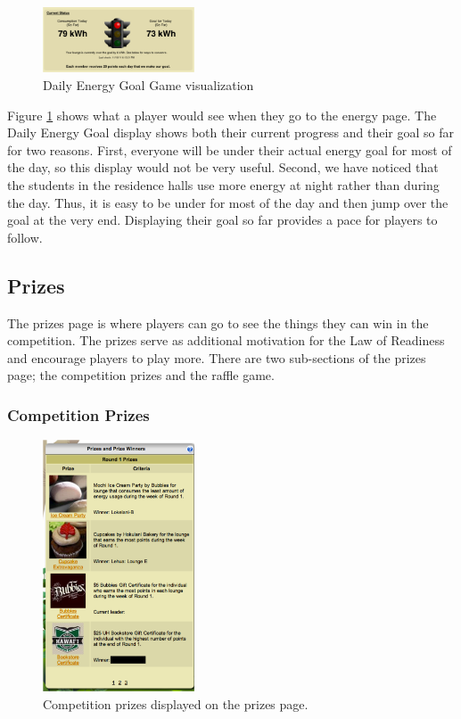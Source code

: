 \begin{figure}[t!]
  \center
  \includegraphics[width=0.4\textwidth]{images/daily-energy-goal-game.eps}
  \caption{Daily Energy Goal Game visualization}
  \label{fig:DailyEnergyGoal}
\end{figure}

Figure \ref{fig:DailyEnergyGoal} shows what a player would see when they go to the energy page. The Daily Energy Goal display shows both their current progress and their goal so far for two reasons. First, everyone will be under their actual energy goal for most of the day, so this display would not be very useful. Second, we have noticed that the students in the residence halls use more energy at night rather than during the day. Thus, it is easy to be under for most of the day and then jump over the goal at the very end. Displaying their goal so far provides a pace for players to follow.

\subsection{Prizes}
\label{makahiki:pages-prizes}

The prizes page is where players can go to see the things they can win in the competition. The prizes serve as additional motivation for the Law of Readiness and encourage players to play more. There are two sub-sections of the prizes page; the competition prizes and the raffle game.

\subsubsection{Competition Prizes}

\begin{figure}[h]
  \center
  \includegraphics[width=0.4\textwidth]{images/prizes-winners.eps}
  \caption{Competition prizes displayed on the prizes page.}
  \label{fig:prizes-winners}
\end{figure}

